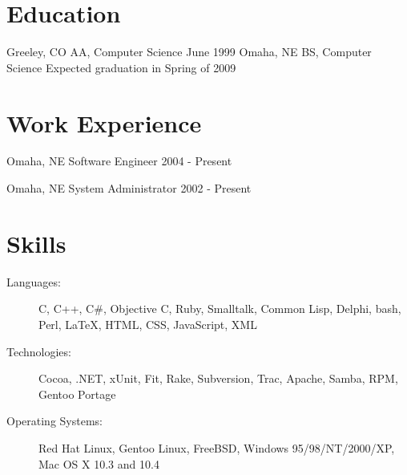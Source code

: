 \documentclass{resume}
\begin{document}
\section{Education}
\begin{itemize}
             {Greeley, CO}
             {AA, Computer Science}
             {June 1999}
             {Omaha, NE}
             {BS, Computer Science}
             {Expected graduation in Spring of 2009}
\end{itemize}

\section{Work Experience}
\begin{itemize}
           {Omaha, NE}
           {Software Engineer }
           {2004 - Present}
  \begin{itemize}
  \end{itemize}

           {Omaha, NE}
           {System Administrator}
           {2002 - Present}
  \begin{itemize}
  \end{itemize}
\end{itemize}

\section{Skills}

\begin{description}
\item[Languages:] C, C++, C\#, Objective C, Ruby, Smalltalk, Common Lisp,
  Delphi, bash, Perl, \LaTeX, HTML, CSS, JavaScript, XML
\item[Technologies:] Cocoa, .NET, xUnit, Fit, Rake, Subversion, Trac, Apache,
  Samba, RPM, Gentoo Portage
\item[Operating Systems:] Red Hat Linux, Gentoo Linux, FreeBSD, Windows
  95/98/NT/2000/XP, Mac OS X 10.3 and 10.4
\end{description}
\end{document}
